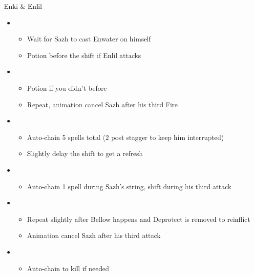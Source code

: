 \begin{battle}[1:39]{Enki \& Enlil}
\begin{itemize}
\begin{itemize}
\begin{itemize}
				      \item Repeat slightly after Bellow happens and Deprotect is removed to reinflict
				      \item If Enki survived, animation cancel Sazh into [1] and then go to [2]
			      \end{itemize}
			\item \second
			      \begin{itemize}
				      \item Wait for Sazh to cast Enwater on himself
				      \item Potion before the shift if Enlil attacks
			      \end{itemize}
			\item \fifth
			      \begin{itemize}
				      \item Potion if you didn't before
				      \item Repeat, animation cancel Sazh after his third Fire
			      \end{itemize}
			\item \fourth
			      \begin{itemize}
				      \item Auto-chain 5 spells total (2 post stagger to keep him interrupted)
				      \item Slightly delay the shift to get a refresh
			      \end{itemize}
			\item \first
			      \begin{itemize}
				      \item Auto-chain 1 spell during Sazh's string, shift during his third attack
			      \end{itemize}
			\item \sixth
			      \begin{itemize}
				      \item Repeat slightly after Bellow happens and Deprotect is removed to reinflict
				      \item Animation cancel Sazh after his third attack
			      \end{itemize}
			\item \first
			      \begin{itemize}
				      \item Auto-chain to kill if needed
			      \end{itemize}
		\end{itemize}
		\end{itemize}
\end{battle}
